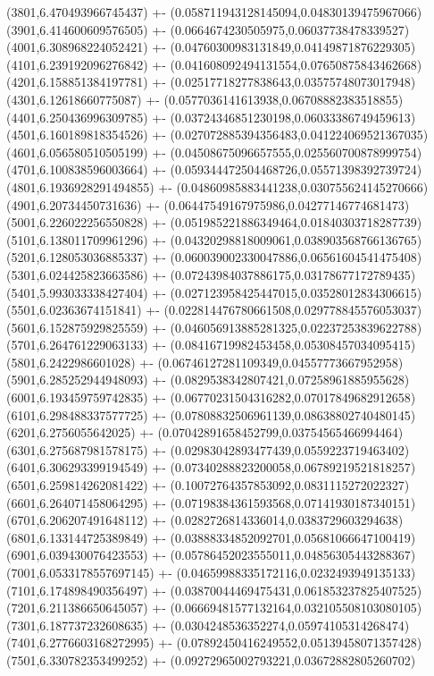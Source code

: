 {(3801,6.470493966745437) +- (0.058711943128145094,0.04830139475967066)
(3901,6.414600609576505) +- (0.0664674230505975,0.06037738478339527)
(4001,6.308968224052421) +- (0.04760300983131849,0.04149871876229305)
(4101,6.239192096276842) +- (0.041608092494131554,0.07650875843462668)
(4201,6.158851384197781) +- (0.02517718277838643,0.03575748073017948)
(4301,6.12618660775087) +- (0.0577036141613938,0.06708882383518855)
(4401,6.250436996309785) +- (0.03724346851230198,0.06033386749459613)
(4501,6.160189818354526) +- (0.027072885394356483,0.041224069521367035)
(4601,6.056580510505199) +- (0.04508675096657555,0.025560700878999754)
(4701,6.100838596003664) +- (0.059344472504468726,0.05571398392739724)
(4801,6.1936928291494855) +- (0.04860985883441238,0.030755624145270666)
(4901,6.20734450731636) +- (0.06447549167975986,0.04277146774681473)
(5001,6.226022256550828) +- (0.051985221886349464,0.01840303718287739)
(5101,6.138011709961296) +- (0.04320298818009061,0.038903568766136765)
(5201,6.128053036885337) +- (0.060039002330047886,0.06561604541475408)
(5301,6.024425823663586) +- (0.07243984037886175,0.03178677172789435)
(5401,5.993033338427404) +- (0.027123958425447015,0.03528012834306615)
(5501,6.02363674151841) +- (0.022814476780661508,0.029778845576053037)
(5601,6.152875929825559) +- (0.046056913885281325,0.02237253839622788)
(5701,6.264761229063133) +- (0.08416719982453458,0.05308457034095415)
(5801,6.2422986601028) +- (0.06746127281109349,0.04557773667952958)
(5901,6.285252944948093) +- (0.0829538342807421,0.07258961885955628)
(6001,6.193459759742835) +- (0.06770231504316282,0.07017849682912658)
(6101,6.298488337577725) +- (0.07808832506961139,0.08638802740480145)
(6201,6.2756055642025) +- (0.07042891658452799,0.03754565466994464)
(6301,6.275687981578175) +- (0.02983042893477439,0.0559223719463402)
(6401,6.306293399194549) +- (0.07340288823200058,0.06789219521818257)
(6501,6.259814262081422) +- (0.10072764357853092,0.0831115272022327)
(6601,6.264071458064295) +- (0.07198384361593568,0.07141930187340151)
(6701,6.206207491648112) +- (0.0282726814336014,0.0383729603294638)
(6801,6.133144725389849) +- (0.03888334852092701,0.05681066647100419)
(6901,6.039430076423553) +- (0.05786452023555011,0.04856305443288367)
(7001,6.0533178557697145) +- (0.04659988335172116,0.0232493949135133)
(7101,6.174898490356497) +- (0.03870044469475431,0.061853237825407525)
(7201,6.211386650645057) +- (0.06669481577132164,0.032105508103080105)
(7301,6.187737232608635) +- (0.0304248536352274,0.05974105314268474)
(7401,6.2776603168272995) +- (0.07892450416249552,0.05139458071357428)
(7501,6.330782353499252) +- (0.09272965002793221,0.03672882805260702)
}
